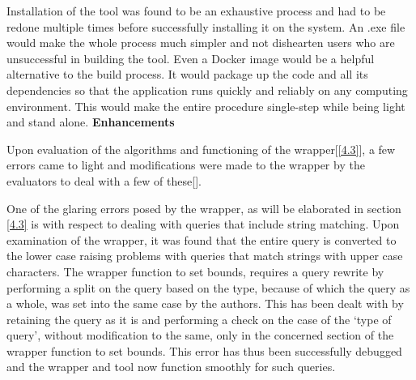 \documentclass[acmsmall]{acmart}
\begin{document}
Installation of the tool was found to be an exhaustive process and had to be redone multiple times before successfully installing it on the system. An .exe file would make the whole process much simpler and not dishearten users who are unsuccessful in building the tool. Even a Docker image would be a helpful alternative to the build process. It would package up the code and all its dependencies so that the application runs quickly and reliably on any computing environment. This would make the entire procedure single-step while being light and stand alone.
\newline
\newline
\textbf{Enhancements}

Upon evaluation of the algorithms and functioning of the wrapper[\ref{4.3}], a few errors came to light and modifications were made to the wrapper by the evaluators to deal with a few of these[\cite{adithi2020ppa}].

One of the glaring errors posed by the wrapper, as will be elaborated in section \ref{4.3} is with respect to dealing with queries that include string matching. Upon examination of the wrapper, it was found that the entire query is converted to the lower case raising problems with queries that match strings with upper case characters. The wrapper function to set bounds, requires a query rewrite by performing a split on the query based on the type, because of which the query as a whole, was set into the same case by the authors. This has been dealt with by retaining the query as it is and performing a check on the case of the ‘type of query’, without modification to the same, only in the concerned section of the wrapper function to set bounds. This error has thus been successfully debugged and the wrapper and tool now function smoothly for such queries.
\end{document}
